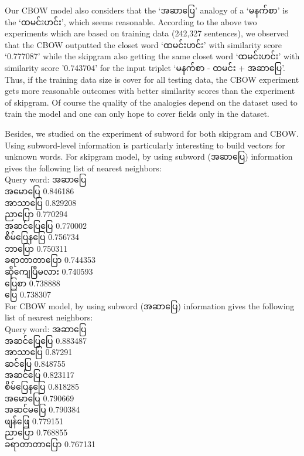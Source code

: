 \documentclass[conference]{IEEEtran}
\begin{document}
Our CBOW model also considers that the `{\padauktext အဆာပြေ}' analogy of a `{\padauktext မနက်စာ}' is the `{\padauktext ထမင်းဟင်း}', which seems reasonable. 
According to the above two experiments which are based on training data (242,327 sentences), we observed that the CBOW outputted the closet word `{\padauktext ထမင်းဟင်း}' with similarity score `0.777087' while the skipgram also getting the same closet word `{\padauktext ထမင်းဟင်း}' with similarity score '0.743704' for the input triplet `{\padauktext မနက်စာ - ထမင်း + အဆာပြေ}'. Thus, if the training data size is cover for all testing data, the CBOW experiment gets more reasonable outcomes with better similarity scores than the experiment of skipgram. Of course the quality of the analogies depend on the dataset used to train the model and one can only hope to cover fields only in the dataset. 

Besides, we studied on the experiment of subword for both skipgram and CBOW. Using subword-level information is particularly interesting to build vectors for unknown words. For skipgram model, by using subword ({\padauktext အဆာပြေ}) information gives the following list of nearest neighbors:\\

\begingroup
Query word: {\padauktext အဆာပြေ}\\
{\padauktext အမောပြေ} 0.846186\\
{\padauktext အာသာပြေ} 0.829208\\
{\padauktext ညာပြော} 0.770294\\
{\padauktext အဆင်ပြေပြေ} 0.770002\\
{\padauktext စိမ်ပြေနပြေ} 0.756734\\
{\padauktext ဘာပြော} 0.750311\\
{\padauktext ခရာတာတာပြော} 0.744353\\
{\padauktext ဆိုကျေပြီမလား} 0.740593\\
{\padauktext ပြေစာ} 0.738888\\
{\padauktext ပြေ} 0.738307\\
\endgroup
For CBOW model, by using subword ({\padauktext အဆာပြေ}) information gives the following list of nearest neighbors:\\

\begingroup
Query word: {\padauktext အဆာပြေ}\\
{\padauktext အဆင်ပြေပြေ} 0.883487\\
{\padauktext အာသာပြေ} 0.87291\\
{\padauktext ဆင်ပြေ} 0.848755\\
{\padauktext အဆင်ပြေ} 0.823117\\
{\padauktext စိမ်ပြေနပြေ} 0.818285\\
{\padauktext အမောပြေ} 0.790669\\
{\padauktext အဆင်မပြေ} 0.790384\\
{\padauktext ဖျန်ဖြေ} 0.779151\\
{\padauktext ညာပြော} 0.768855\\
{\padauktext ခရာတာတာပြော} 0.767131\\\endgroup
\end{document}
